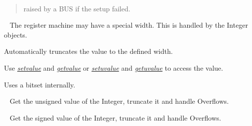 \documentclass[letterpaper,10pt,english]{sphinxmanual}
\begin{document}

\begin{fulllineitems}
\label{core:py_register_machine2.core.parts.BUSSetupError}~\label{core:bussetuperror}\begin{quote}

raised by a BUS if the setup failed.
\end{quote}

\end{fulllineitems}


\begin{fulllineitems}
\label{core:py_register_machine2.core.parts.Integer}~\label{core:integer}
The register machine may have a special width.
This is handled by the Integer objects.

Automatically truncates the value to the defined width.

Use {\hyperref[core:setvalue]{\emph{setvalue}}} and {\hyperref[core:getvalue]{\emph{getvalue}}} or {\hyperref[core:setuvalue]{\emph{setuvalue}}} and {\hyperref[core:getuvalue]{\emph{getuvalue}}} to access the value.

Uses a bitset internally.

\begin{fulllineitems}
\label{core:py_register_machine2.core.parts.Integer.getuvalue}~\label{core:getuvalue}
Get the unsigned value of the Integer, truncate it and handle Overflows.

\end{fulllineitems}


\begin{fulllineitems}
\label{core:py_register_machine2.core.parts.Integer.getvalue}~\label{core:getvalue}
Get the signed value of the Integer, truncate it and handle Overflows.

\end{fulllineitems}


\end{fulllineitems}
\end{document}
